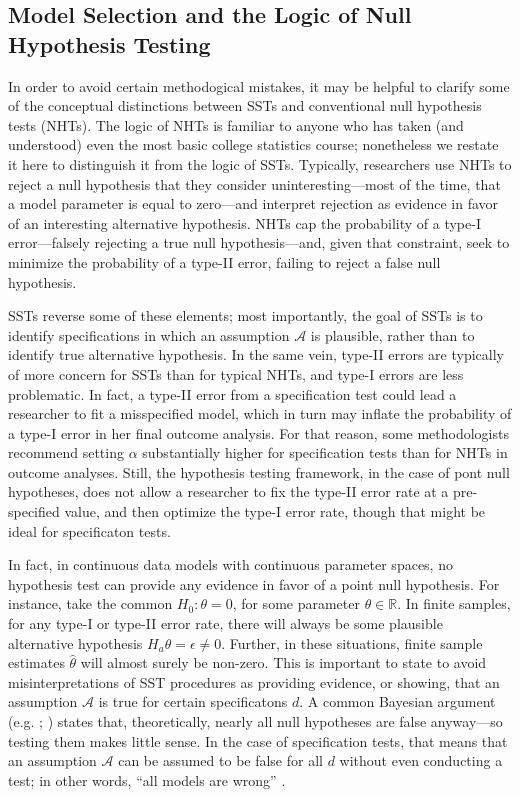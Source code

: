 \documentclass[12pt]{article}\usepackage[]{graphicx}\usepackage[]{color}
\begin{document}
\subsection{Model Selection and the Logic of Null Hypothesis Testing}
In order to avoid certain methodogical mistakes, it may be helpful to
clarify some of the conceptual distinctions between SSTs and
conventional null hypothesis tests (NHTs).
The logic of NHTs is familiar to anyone who has taken (and understood)
even the most basic college statistics course; nonetheless we restate
it here to distinguish it from the logic of SSTs.
Typically, researchers use NHTs to reject a null hypothesis that they
consider uninteresting---most of the time, that a model parameter is
equal to zero---and interpret rejection as evidence in favor of an
interesting alternative hypothesis.
NHTs cap the probability of a type-I error---falsely rejecting a true
null hypothesis---and, given that constraint, seek to minimize the
probability of a type-II error, failing to reject a false null
hypothesis.

SSTs reverse some of these elements; most importantly, the goal of
SSTs is to identify specifications in which an assumption
$\mathcal{A}$ is plausible, rather than to identify true alternative
hypothesis.
In the same vein, type-II errors are typically of more concern for
SSTs than for typical NHTs, and type-I errors are less problematic.
In fact, a type-II error from a specification test could lead a
researcher to fit a misspecified model, which in turn may inflate the
probability of a type-I error in her final outcome analysis.
For that reason, some methodologists recommend setting $\alpha$
substantially higher for specification tests than for NHTs in outcome
analyses.
Still, the hypothesis testing framework, in the case of pont null
hypotheses, does not allow a researcher to
fix the type-II error rate at a pre-specified value, and then optimize
the type-I error rate, though that might be ideal for
specificaton tests.

In fact, in continuous data models with continuous parameter spaces,
no hypothesis test can provide any evidence in favor of a point null
hypothesis.
For instance, take the common $H_0: \theta=0$, for some parameter
$\theta\in \mathbb{R}$.
In finite samples, for any type-I or type-II error rate, there will
always be some plausible alternative hypothesis $H_a
\theta=\epsilon\ne 0$.
Further, in these situations, finite sample estimates $\hat{\theta}$
will almost surely be non-zero.
This is important to state to avoid misinterpretations of SST
procedures as providing evidence, or showing, that an assumption
$\mathcal{A}$ is true for certain specificatons $d$.
A common Bayesian argument (e.g. \citealp[][p. 439]{kadanePrinciples};
\citealp{gelmanBlog}) states that, theoretically, nearly all null
hypotheses are false anyway---so testing them makes little sense.
In the case of specification tests, that means that an assumption
$\mathcal{A}$ can be assumed to be false for all $d$ without even
conducting a test; in other words, ``all models are wrong''
\citep[p. 2]{modelsWrong}.
\end{document}
